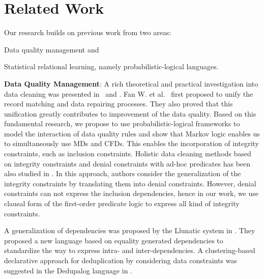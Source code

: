 \section{Related Work}
\label{sec:related}

Our research builds on previous work from two areas: 
\begin{inparaenum}[\itshape 1\upshape)]
\item Data quality management and
\item Statistical relational learning, namely probabilistic-logical languages.
\end{inparaenum}

\textbf{Data Quality Management}: A rich theoretical and practical investigation into data cleaning was presented in~\cite{Fan:2014:IRM:2628135.2567657} and \cite{fellegi1976systematic}. Fan W. et al.~\cite{Fan:2011:IRM:1989323.1989373} first proposed to unify the record matching and data repairing processes. They also proved that this unification greatly contributes to improvement of the data quality. Based on this fundamental research, we propose to use probabilistic-logical frameworks to model the interaction of data quality rules and show that Markov logic enables us to simultaneously use MDs and CFDs. This enables the incorporation of integrity constraints, such as inclusion constraints. Holistic data cleaning methods based on integrity constraints and denial constraints with ad-hoc predicates has been also studied in \cite{chu2013holistic}. In this approach, authors consider the generalization of the integrity constraints by translating them into denial constraints. However, denial constraints can not express the inclusion dependencies, hence in our work, we use clausal form of the first-order predicate logic to express all kind of integrity constraints.

A generalization of dependencies was proposed by the Llunatic system in \cite{llunaticVDLB2013b}. They proposed a new language based on equality generated dependencies to standardize the way to express intra- and inter-dependencies. A clustering-based declarative approach for deduplication by considering data constraints was suggested in the Dedupalog language in \cite{Arasu:2009:LDC:1546683.1547340}.

